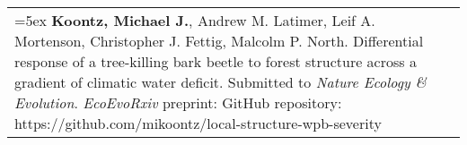 \begin{longtable}{@{} >{\raggedright}p{5.25in} >{\raggedleft}X @{}}


\hangindent=5ex \textbf{Koontz, Michael J.}, Andrew M. Latimer, Leif A. Mortenson, Christopher J. Fettig, Malcolm P. North. Differential response of a tree-killing bark beetle to forest structure across a gradient of climatic water deficit. Submitted to \emph{Nature Ecology \& Evolution}.
\newline \emph{EcoEvoRxiv} preprint: 
\newline GitHub repository: https://github.com/mikoontz/local-structure-wpb-severity & 2019 \tabularnewline

\end{longtable}